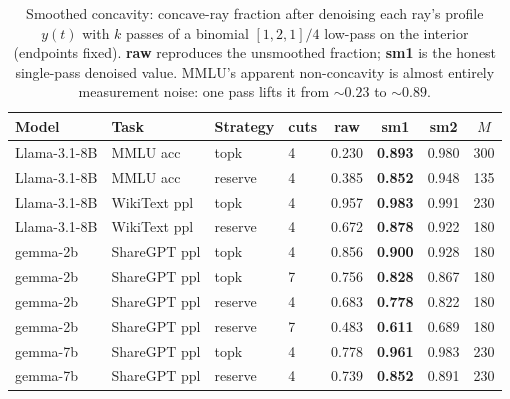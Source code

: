 \begin{table}[t]
  \centering
  \caption{Smoothed concavity: concave-ray fraction after denoising each ray's
  profile $y(t)$ with $k$ passes of a binomial $[1,2,1]/4$ low-pass on the interior
  (endpoints fixed). \textbf{raw} reproduces the unsmoothed fraction; \textbf{sm1}
  is the honest single-pass denoised value. MMLU's apparent non-concavity is
  almost entirely measurement noise: one pass lifts it from ${\sim}0.23$ to
  ${\sim}0.89$.}
  \label{tab:smoothed-concavity}
  \begin{tabular}{llllcccc}
    \toprule
    Model & Task & Strategy & cuts & raw & \textbf{sm1} & sm2 & $M$ \\
    \midrule
    Llama-3.1-8B & MMLU acc     & topk    & 4 & 0.230 & \textbf{0.893} & 0.980 & 300 \\
    Llama-3.1-8B & MMLU acc     & reserve & 4 & 0.385 & \textbf{0.852} & 0.948 & 135 \\
    Llama-3.1-8B & WikiText ppl & topk    & 4 & 0.957 & \textbf{0.983} & 0.991 & 230 \\
    Llama-3.1-8B & WikiText ppl & reserve & 4 & 0.672 & \textbf{0.878} & 0.922 & 180 \\
    gemma-2b     & ShareGPT ppl & topk    & 4 & 0.856 & \textbf{0.900} & 0.928 & 180 \\
    gemma-2b     & ShareGPT ppl & topk    & 7 & 0.756 & \textbf{0.828} & 0.867 & 180 \\
    gemma-2b     & ShareGPT ppl & reserve & 4 & 0.683 & \textbf{0.778} & 0.822 & 180 \\
    gemma-2b     & ShareGPT ppl & reserve & 7 & 0.483 & \textbf{0.611} & 0.689 & 180 \\
    gemma-7b     & ShareGPT ppl & topk    & 4 & 0.778 & \textbf{0.961} & 0.983 & 230 \\
    gemma-7b     & ShareGPT ppl & reserve & 4 & 0.739 & \textbf{0.852} & 0.891 & 230 \\
    \bottomrule
  \end{tabular}
\end{table}
